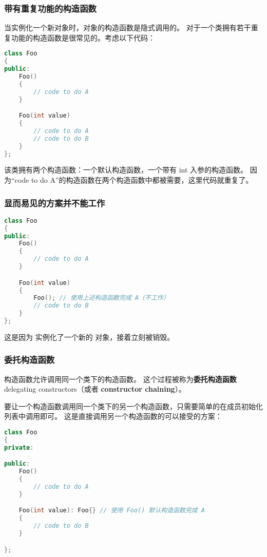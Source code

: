 \documentclass[../../LearnCpp.tex]{subfiles}
\begin{document}

\subsubsection*{带有重复功能的构造函数}

当实例化一个新对象时，对象的构造函数是隐式调用的。
对于一个类拥有若干重复功能的构造函数是很常见的。考虑以下代码：

\begin{lstlisting}[language=C++]
class Foo
{
public:
    Foo()
    {
        // code to do A
    }

    Foo(int value)
    {
        // code to do A
        // code to do B
    }
};
\end{lstlisting}

该类拥有两个构造函数：一个默认构造函数，一个带有 int 入参的构造函数。
因为“code to do A”的构造函数在两个构造函数中都被需要，这里代码就重复了。

\subsubsection*{显而易见的方案并不能工作}

\begin{lstlisting}[language=C++]
class Foo
{
public:
    Foo()
    {
        // code to do A
    }

    Foo(int value)
    {
        Foo(); // 使用上述构造函数完成 A（不工作）
        // code to do B
    }
};
\end{lstlisting}

这是因为  实例化了一个新的  对象，接着立刻被销毁。

\subsubsection*{委托构造函数}

构造函数允许调用同一个类下的构造函数。
这个过程被称为\textbf{委托构造函数} delegating constructors（或者 \textbf{constructor chaining}）。

要让一个构造函数调用同一个类下的另一个构造函数，只需要简单的在成员初始化列表中调用即可。
这是直接调用另一个构造函数的可以接受的方案：

\begin{lstlisting}[language=C++]
class Foo
{
private:

public:
    Foo()
    {
        // code to do A
    }

    Foo(int value): Foo{} // 使用 Foo() 默认构造函数完成 A
    {
        // code to do B
    }

};
\end{lstlisting}
\end{document}
